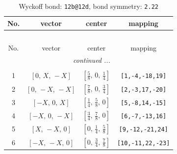 \documentclass[fleqn,8pt]{jsarticle}
\begin{document}
\renewcommand{\arraystretch}{1.2}
\begin{longtable}{cccc}
\caption{Wyckoff bond: {\tt 12b@12d}, bond symmetry: {\tt 2.22}}
 \\
 \hline \hline
No. & vector & center & mapping \\ \hline \endfirsthead

\multicolumn{3}{l}{\tablename\ \thetable{}} \\
 \hline \hline
No. & vector & center & mapping \\ \hline \endhead

 \hline \hline
\multicolumn{3}{r}{\footnotesize\it continued ...} \\ \endfoot

 \hline \hline
\multicolumn{3}{r}{} \\ \endlastfoot

1 & $\left[ 0,\, X,\, - X \right]$ & $\left[ \frac{5}{8},\, 0,\, \frac{1}{4} \right]$ & {\tt [1,-4,-18,19]} \\ \hline
2 & $\left[ 0,\, - X,\, - X \right]$ & $\left[ \frac{7}{8},\, 0,\, \frac{3}{4} \right]$ & {\tt [2,-3,17,-20]} \\ \hline
3 & $\left[ - X,\, 0,\, X \right]$ & $\left[ \frac{1}{4},\, \frac{5}{8},\, 0 \right]$ & {\tt [5,-8,14,-15]} \\ \hline
4 & $\left[ - X,\, 0,\, - X \right]$ & $\left[ \frac{3}{4},\, \frac{7}{8},\, 0 \right]$ & {\tt [6,-7,-13,16]} \\ \hline
5 & $\left[ X,\, - X,\, 0 \right]$ & $\left[ 0,\, \frac{1}{4},\, \frac{5}{8} \right]$ & {\tt [9,-12,-21,24]} \\ \hline
6 & $\left[ - X,\, - X,\, 0 \right]$ & $\left[ 0,\, \frac{3}{4},\, \frac{7}{8} \right]$ & {\tt [10,-11,22,-23]} \\
\end{longtable}
\renewcommand{\arraystretch}{1.2}
\end{document}
